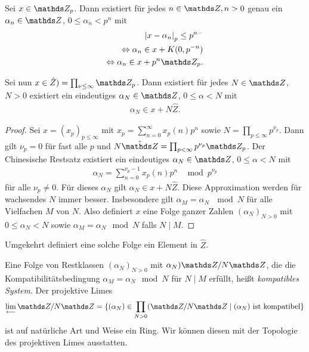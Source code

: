 Sei $x\in \Z_p$. Dann existiert für jedes $n \in \Z, n>0$ genau ein $\alpha_n \in \Z$, $0 \leq \alpha_n<p^n$ mit
\begin{align*}
\abs{x-\alpha_n}_p \leq p^{n-}\\
\Leftrightarrow \alpha_n \in x+K(0,p^{-n})\\
\Leftrightarrow \alpha_n \in x+p^n \Z_p.
\end{align*}

\begin{thm}
Sei nun $x\in \hat{Z})=\prod_{\nu \leq \infty} \Z_p$. Dann existiert für jedes $N \in \Z$, $N>0$ existiert ein eindeutiges $\alpha_N\in \Z$, $0 \leq \alpha<N$ mit
\begin{align*}
\alpha_N \in x + N\hat{Z}.
\end{align*}
\end{thm}
\begin{proof}
Sei $x=(x_p)_{p\leq \infty}$ mit $x_p=\sum_{n=0}^\infty x_p(n)p^n$ sowie $N=\prod_{p\leq \infty} p^{\nu_p}$.
Dann gilt $\nu_p=0$ für fast alle $p$ und $N\hat{\Z}=\prod_{p<\infty}p^{\nu_p} \Z_p$.
Der Chinesische Restsatz existiert ein eindeutiges $\alpha_N \in \Z$, $0\leq \alpha <N$ mit 
\begin{align*}
\alpha_N=\sum_{n=0}^{\nu_p-1} x_p(n)p^n~~\mod p^{\nu_p}
\end{align*}
für alle $\nu_p\not =0$. Für dieses $\alpha_N$ gilt $\alpha_N \in x+N \hat{Z}$.
Diese Approximation werden für wachsendes $N$ immer besser.
Insbesondere gilt $\alpha_M=\alpha_N ~\mod N$ für alle Vielfachen $M$ von $N$. Also definiert $x$ eine Folge ganzer Zahlen $(\alpha_N)_{N>0}$ mit $0\leq \alpha_N <N$ sowie $\alpha_M=\alpha_N \mod N$ falls $N\mid M$.
\end{proof}

Umgekehrt definiert eine solche Folge ein Element in $\hat{Z}$.

\begin{defi}
Eine Folge von Restklassen $(\alpha_N)_{N>0}$ mit $\alpha_N)\Z /N\Z$, die die Kompatibilitätsbedingung $\alpha_M=\alpha_N \mod N$ für $N \mid M$ erfüllt, heißt \emph{kompatibles System}.
Der projektive Limes
\begin{align*}
\lim_{\longleftarrow} \Z /N \Z=\{(\alpha_N) \in \prod_{N>0} (\Z /N \Z \mid (\alpha_N) \text{ ist kompatibel}\}
\end{align*}
ist auf natürliche Art und Weise ein Ring.
Wir können diesen mit der Topologie des projektiven Limes ausstatten.
\end{defi}

